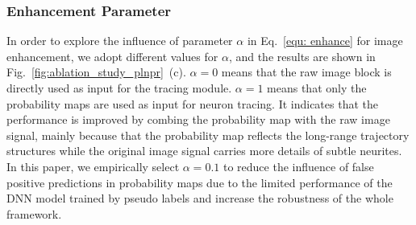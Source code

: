 \subsubsection{Enhancement Parameter} 

In order to explore the influence of parameter $\alpha$ in Eq.~\eqref{equ: enhance} for image enhancement, we adopt different values for $\alpha$, and the results are shown in Fig.~\ref{fig:ablation_study_plnpr}~(c).
$\alpha=0$ means that the raw image block is directly used as input for the tracing module.
$\alpha=1$ means that only the probability maps are used as input for neuron tracing. 
It indicates that the performance is improved by combing the probability map with the raw image signal, mainly because that the probability map reflects the long-range trajectory structures while the original image signal carries more details of subtle neurites.
In this paper, we empirically select $\alpha=0.1$ to reduce the influence of false positive predictions in probability maps due to the limited performance of the DNN model trained by pseudo labels and increase the robustness of the whole framework.



